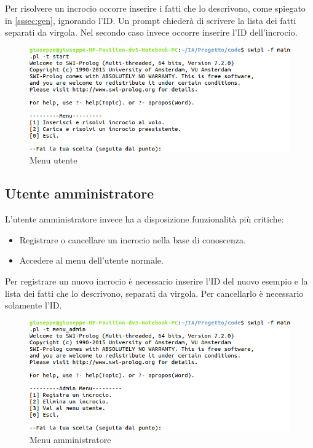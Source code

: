 Per risolvere un incrocio occorre inserire i fatti che lo descrivono, come spiegato in \ref{sssec:gen}, ignorando l'ID. Un prompt chiederà di scrivere la lista dei fatti separati da virgola. Nel secondo caso invece occorre inserire l'ID dell'incrocio.

\begin{figure}[!hbtp]
	\includegraphics[width=\textwidth]{images/user}
	\caption{Menu utente}
\end{figure}


\subsection{Utente amministratore}
L'utente amministratore invece ha a disposizione funzionalità più critiche:
\begin{itemize}
	\item Registrare o cancellare un incrocio nella base di conoscenza.
	\item Accedere al menu dell'utente normale.
\end{itemize}

Per registrare un nuovo incrocio è necessario inserire l'ID del nuovo esempio e la lista dei fatti che lo descrivono, separati da virgola. Per cancellarlo è necessario solamente l'ID.

\begin{figure}[!hbtp]
	\includegraphics[width=\textwidth]{images/admin}
	\caption{Menu amministratore}
\end{figure}

